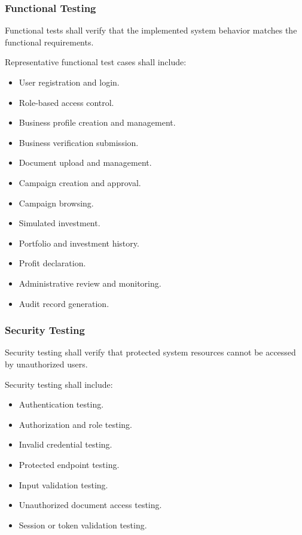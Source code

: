 \subsubsection{Functional Testing}

Functional tests shall verify that the implemented system behavior
matches the functional requirements.

Representative functional test cases shall include:

\begin{itemize}
    \item User registration and login.
    \item Role-based access control.
    \item Business profile creation and management.
    \item Business verification submission.
    \item Document upload and management.
    \item Campaign creation and approval.
    \item Campaign browsing.
    \item Simulated investment.
    \item Portfolio and investment history.
    \item Profit declaration.
    \item Administrative review and monitoring.
    \item Audit record generation.
\end{itemize}

\subsubsection{Security Testing}

Security testing shall verify that protected system resources cannot be
accessed by unauthorized users.

Security testing shall include:

\begin{itemize}
    \item Authentication testing.
    \item Authorization and role testing.
    \item Invalid credential testing.
    \item Protected endpoint testing.
    \item Input validation testing.
    \item Unauthorized document access testing.
    \item Session or token validation testing.
\end{itemize}

